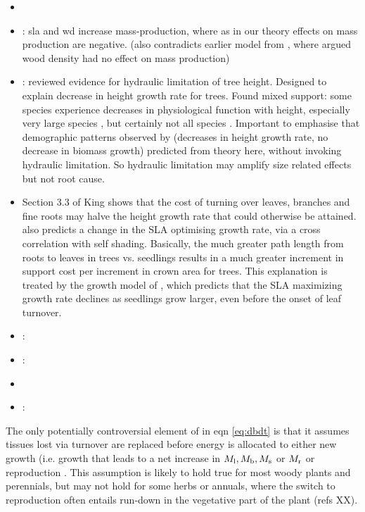 \documentclass[a4paper,11pt]{article}
\begin{document}
\begin{itemize}
  \item \citet{Ishihara-2016}
  \item  \citet{Enquist-2007}: sla and wd increase mass-production, where as in our theory effects on mass production are negative. (also contradicts earlier model from \citet{Enquist-1999}, where argued wood density had no effect on mass production)
  \item \citet{Ryan-2006}: reviewed evidence for hydraulic limitation of tree height. Designed to explain decrease in height growth rate for trees. Found mixed support: some species experience decreases in physiological function with height, especially very large species \citep{Koch-2004}, but certainly not all species \citep{Ryan-2006}. Important to emphasise that demographic patterns observed by \citep{Ryan-2006} (decreases in height growth rate, no decrease in biomass growth) predicted from theory here, without invoking hydraulic limitation. So hydraulic limitation may amplify size related effects but not root cause.
  \item \citet{King-2005} Section 3.3 of King  shows that the cost of turning over leaves, branches and fine roots may halve the height growth rate that could otherwise be attained. \citet{King-1999} also predicts a change in the SLA optimising growth rate, via a cross correlation with self shading. Basically, the much greater path length from roots to leaves in trees vs. seedlings results in a much greater increment in support cost per increment in crown area for trees. This explanation is treated by the growth model of \citet{King-1999}, which predicts that the SLA maximizing growth rate declines as seedlings grow larger, even before the onset of leaf turnover.
  \item \citet{King-1999}:
  \item \citet{Li-2014}:
  \item \citep{Givnish-1988,Yokozawa-1995,Makela-1997,King-2011,Moorcroft-2001}
  \item \citep{Coomes-2011}:
\end{itemize}


The only potentially controversial element of in eqn \ref{eq:dbdt} is that it assumes tissues lost via turnover are replaced before energy is allocated to either new growth (i.e. growth that leads to a net increase in $M_{\rm l}, M_{\rm b}, M_{\rm s}$ or $M_{\rm r}$ or reproduction \citep{Thornley-2000}. This assumption is likely to hold true for most woody plants and perennials, but may not hold for some herbs or annuals, where the switch to reproduction often entails run-down in the vegetative part of the plant (refs XX).
\end{document}
